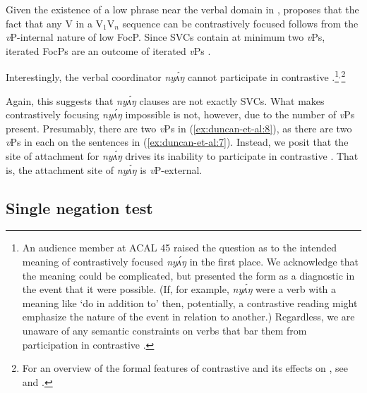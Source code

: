 \documentclass[output=paper,modfonts,nonflat,
hidelinks
]{langsci/langscibook}
\begin{document}
\noindent Given the existence of a low  phrase near the verbal domain in  \citep{duncan-toappear}, \citet{duncan2016parallel} proposes that the fact that any V in a V$_1$V$_n$ sequence can be contrastively focused follows from the \textit{v}P-internal nature of low FocP. Since SVCs contain at minimum two \textit{v}Ps, iterated FocPs are an outcome of iterated \textit{v}Ps \citep[98-100]{duncan2016parallel}. 

Interestingly, the verbal coordinator \textit{ny\'{ʌ}ŋ} cannot participate in contrastive .\footnote{An audience member at ACAL 45 raised the question as to the intended meaning of contrastively focused \textit{ny\'{ʌ}ŋ} in the first place. We acknowledge that the meaning could be complicated, but presented the form as a diagnostic in the event that it were possible. (If, for example, \textit{ny\'{ʌ}ŋ} were a verb with a meaning like `do in addition to' then, potentially, a contrastive  reading might emphasize the nature of the event in relation to another.) Regardless, we are unaware of any semantic constraints on verbs that bar them from participation in contrastive .}$^,$\footnote{For an overview of the formal features of  contrastive  and its effects on , see \citet{akinlabi2003} and \citet{duncan-toappear}.}


 \label{ex:duncan-et-al:8}
\z

\noindent Again, this suggests that \textit{ny\'{ʌ}ŋ} clauses are not exactly SVCs. What makes contrastively focusing \textit{ny\'{ʌ}ŋ} impossible is not, however, due to the number of \textit{v}Ps present. Presumably, there are two \textit{v}Ps in (\ref{ex:duncan-et-al:8}), as there are two \textit{v}Ps in each on the sentences in (\ref{ex:duncan-et-al:7}). Instead, we posit that the site of attachment for \textit{ny\'{ʌ}ŋ} drives its inability to participate in contrastive . That is, the attachment site of \textit{ny\'{ʌ}ŋ} is \textit{v}P-external.

\subsection{Single negation test}\label{sec:duncan-et-al:2.3}
\end{document}
